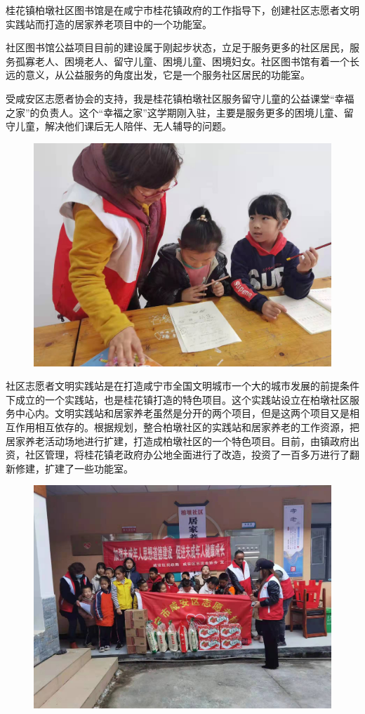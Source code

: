 桂花镇柏墩社区图书馆是在咸宁市桂花镇政府的工作指导下，创建社区志愿者文明实践站而打造的居家养老项目中的一个功能室。

社区图书馆公益项目目前的建设属于刚起步状态，立足于服务更多的社区居民，服务孤寡老人、困境老人、留守儿童、困境儿童、困境妇女。社区图书馆有着一个长远的意义，从公益服务的角度出发，它是一个服务社区居民的功能室。

受咸安区志愿者协会的支持，我是桂花镇柏墩社区服务留守儿童的公益课堂“幸福之家”的负责人。这个“幸福之家”这学期刚入驻，主要是服务更多的困境儿童、留守儿童，解决他们课后无人陪伴、无人辅导的问题。

\begin{figure}[htbp]

\centering

\includegraphics[width = .5\textwidth]{./ch/yjp2.jpg}

\end{figure}
    
社区志愿者文明实践站是在打造咸宁市全国文明城市一个大的城市发展的前提条件下成立的一个实践站，也是桂花镇打造的特色项目。这个实践站设立在柏墩社区服务中心内。文明实践站和居家养老虽然是分开的两个项目，但是这两个项目又是相互作用相互依存的。根据规划，整合柏墩社区的实践站和居家养老的工作资源，把居家养老活动场地进行扩建，打造成柏墩社区的一个特色项目。目前，由镇政府出资，社区管理，将桂花镇老政府办公地全面进行了改造，投资了一百多万进行了翻新修建，扩建了一些功能室。

\begin{figure}[htbp]

\centering

\includegraphics[width = .5\textwidth]{./ch/yjp3.jpg}

\end{figure}

